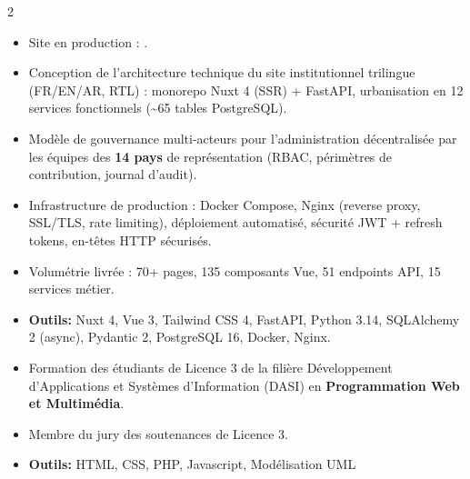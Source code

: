 \documentclass[10pt,a4paper,ragged2e,withhyper]{altacv}
\begin{document}
\begin{paracol}{2}
            \begin{itemize}
                \item Site en production : .
                \item Conception de l'architecture technique du site institutionnel trilingue (FR/EN/AR, RTL) : monorepo Nuxt 4 (SSR) + FastAPI, urbanisation en 12 services fonctionnels (\textasciitilde65 tables PostgreSQL).
                \item Modèle de gouvernance multi-acteurs pour l'administration décentralisée par les équipes des \textbf{14 pays} de représentation (RBAC, périmètres de contribution, journal d'audit).
                \item Infrastructure de production : Docker Compose, Nginx (reverse proxy, SSL/TLS, rate limiting), déploiement automatisé, sécurité JWT + refresh tokens, en-têtes HTTP sécurisés.
                \item Volumétrie livrée : 70+ pages, 135 composants Vue, 51 endpoints API, 15 services métier.
                \item \textcolor{SecondaryColor}{\textbf{Outils: }} Nuxt 4, Vue 3, Tailwind CSS 4, FastAPI, Python 3.14, SQLAlchemy 2 (async), Pydantic 2, PostgreSQL 16, Docker, Nginx.
            \end{itemize}
            \divider

            \newpage

            \begin{itemize}
                \item Formation des étudiants de Licence 3 de la filière Développement d'Applications et Systèmes d'Information (DASI) en {\textbf{Programmation Web et Multimédia}}.
                \item Membre du jury des soutenances de Licence 3.
                \item \textcolor{SecondaryColor}{\textbf{Outils: }} HTML, CSS, PHP, Javascript, Modélisation UML
            \end{itemize}
            \divider


\end{paracol}
\end{document}
